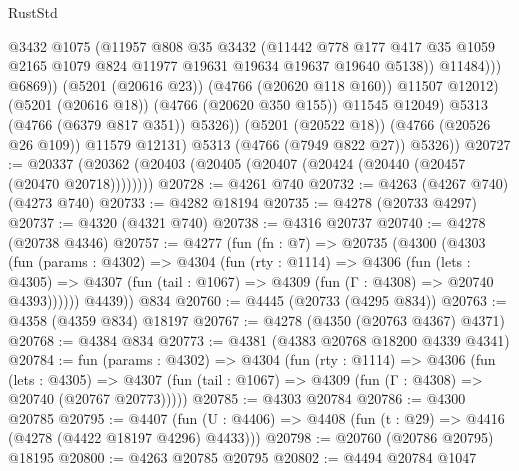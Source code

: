 \begin{lexlean}{RustStd}
\begin{coremodule}
                            @3432
                            @1075
                            (@11957
                              @808
                              @35
                              @3432
                              (@11442
                                @778
                                @177
                                @417
                                @35
                                @1059
                                @2165
                                @1079
                                @824
                                @11977
                                @19631
                                @19634
                                @19637
                                @19640
                                @5138))
                            @11484)))
                      @6869))
                  (@5201 (@20616 @23))
                  (@4766 (@20620 @118 @160))
                  @11507
                  @12012)
                (@5201 (@20616 @18))
                (@4766 (@20620 @350 @155))
                @11545
                @12049)
              @5313
              (@4766 (@6379 @817 @351))
              @5326))
          (@5201 (@20522 @18))
          (@4766 (@20526 @26 @109))
          @11579
          @12131)
        @5313
        (@4766 (@7949 @822 @27))
        @5326))
@20727 := @20337 (@20362 (@20403 (@20405 (@20407 (@20424 (@20440 (@20457 (@20470 @20718))))))))
@20728 := @4261 @740
@20732 := @4263 (@4267 @740) (@4273 @740)
@20733 := @4282 @18194
@20735 := @4278 (@20733 @4297)
@20737 := @4320 (@4321 @740)
@20738 := @4316 @20737
@20740 := @4278 (@20738 @4346)
@20757 := @4277
    (fun (fn : @7) =>
    @20735
      (@4300
        (@4303
          (fun (params : @4302) =>
          @4304
            (fun (rty : @1114) =>
            @4306
              (fun (lets : @4305) =>
              @4307 (fun (tail : @1067) => @4309 (fun (Γ : @4308) => @20740 @4393))))))
        @4439))
    @834
@20760 := @4445 (@20733 (@4295 @834))
@20763 := @4358 (@4359 @834) @18197
@20767 := @4278 (@4350 (@20763 @4367) @4371)
@20768 := @4384 @834
@20773 := @4381 (@4383 @20768 @18200 @4339 @4341)
@20784 := fun (params : @4302) =>
  @4304
    (fun (rty : @1114) =>
    @4306
      (fun (lets : @4305) =>
      @4307 (fun (tail : @1067) => @4309 (fun (Γ : @4308) => @20740 (@20767 @20773)))))
@20785 := @4303 @20784
@20786 := @4300 @20785
@20795 := @4407
    (fun (U : @4406) => @4408 (fun (t : @29) => @4416 (@4278 (@4422 @18197 @4296) @4433)))
@20798 := @20760 (@20786 @20795) @18195
@20800 := @4263 @20785 @20795
@20802 := @4494 @20784 @1047

\end{coremodule}
\end{lexlean}
